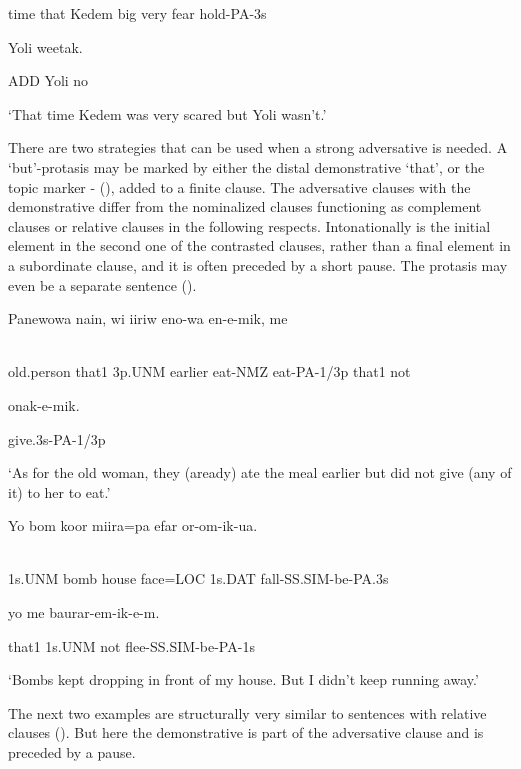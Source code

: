 time  that  Kedem  big  very  fear  hold-PA-3s

  Yoli  weetak.

ADD  Yoli  no

`That time Kedem was very scared but Yoli wasn't.'

There are two strategies that can be used when a strong adversative is needed. A `but'-protasis \citep[237]{Reesink1983b} may be marked by either the distal demonstrative  `that', or the topic marker - (), added to a finite clause. The adversative clauses with the demonstrative  differ from the nominalized clauses functioning as complement clauses or relative clauses in the following respects. Intonationally  is the initial element in the second one of the contrasted clauses, rather than a final element in a subordinate clause, and it is often preceded by a short pause. The protasis may even be a separate sentence (). 

\ea%
\label{ex:x1395}
\gll Panewowa  nain,  wi  iiriw  eno-wa  en-e-mik,    me \\
      \\
\glt
\z

old.person  that1  3p.UNM  earlier  eat-NMZ  eat-PA-1/3p  that1  not

onak-e-mik.

give.3s-PA-1/3p

`As for the old woman, they (aready) ate the meal earlier but did not give (any of it) to her to eat.'

\ea%
\label{ex:x728}
\gll Yo  bom  koor  miira=pa  efar  or-om-ik-ua. \\
      \\
\glt
\z

1s.UNM  bomb  house  face=LOC  1s.DAT  fall-SS.SIM-be-PA.3s

  yo  me  baurar-em-ik-e-m.

that1  1s.UNM  not  flee-SS.SIM-be-PA-1s

`Bombs kept dropping in front of my house. But I didn't keep running away.'

The next two examples are structurally very similar to sentences with relative clauses (). But here the demonstrative  is part of the adversative clause and is preceded by a pause. 

